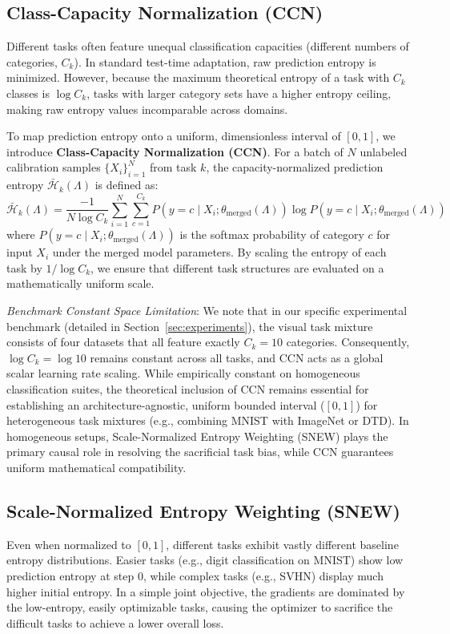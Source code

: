 \subsection{Class-Capacity Normalization (CCN)}
Different tasks often feature unequal classification capacities (different numbers of categories, $C_k$). In standard test-time adaptation, raw prediction entropy is minimized. However, because the maximum theoretical entropy of a task with $C_k$ classes is $\log C_k$, tasks with larger category sets have a higher entropy ceiling, making raw entropy values incomparable across domains. 

To map prediction entropy onto a uniform, dimensionless interval of $[0, 1]$, we introduce \textbf{Class-Capacity Normalization (CCN)}. For a batch of $N$ unlabeled calibration samples $\{X_i\}_{i=1}^N$ from task $k$, the capacity-normalized prediction entropy $\bar{\mathcal{H}}_k(\Lambda)$ is defined as:
\begin{equation}
\label{eq:ccn}
\bar{\mathcal{H}}_k(\Lambda) = \frac{-1}{N \log C_k} \sum_{i=1}^N \sum_{c=1}^{C_k} P(y=c \mid X_i; \theta_{\text{merged}}(\Lambda)) \log P(y=c \mid X_i; \theta_{\text{merged}}(\Lambda))
\end{equation}
where $P(y=c \mid X_i; \theta_{\text{merged}}(\Lambda))$ is the softmax probability of category $c$ for input $X_i$ under the merged model parameters. By scaling the entropy of each task by $1/\log C_k$, we ensure that different task structures are evaluated on a mathematically uniform scale.

\emph{Benchmark Constant Space Limitation}: We note that in our specific experimental benchmark (detailed in Section~\ref{sec:experiments}), the visual task mixture consists of four datasets that all feature exactly $C_k = 10$ categories. Consequently, $\log C_k = \log 10$ remains constant across all tasks, and CCN acts as a global scalar learning rate scaling. While empirically constant on homogeneous classification suites, the theoretical inclusion of CCN remains essential for establishing an architecture-agnostic, uniform bounded interval ($[0, 1]$) for heterogeneous task mixtures (e.g., combining MNIST with ImageNet or DTD). In homogeneous setups, Scale-Normalized Entropy Weighting (SNEW) plays the primary causal role in resolving the sacrificial task bias, while CCN guarantees uniform mathematical compatibility.

\subsection{Scale-Normalized Entropy Weighting (SNEW)}
Even when normalized to $[0, 1]$, different tasks exhibit vastly different baseline entropy distributions. Easier tasks (e.g., digit classification on MNIST) show low prediction entropy at step $0$, while complex tasks (e.g., SVHN) display much higher initial entropy. In a simple joint objective, the gradients are dominated by the low-entropy, easily optimizable tasks, causing the optimizer to sacrifice the difficult tasks to achieve a lower overall loss.

